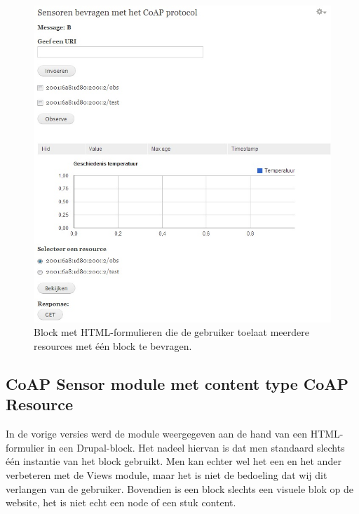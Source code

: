 \begin{figure}[h!]
\centering
\includegraphics[width=1\textwidth]{fig/meerdere_resources}
\caption{Block met HTML-formulieren die de gebruiker toelaat meerdere resources met \'{e}\'{e}n block te bevragen.}
\label{fig:meerdereResources}
\end{figure}

\subsection{CoAP Sensor module met content type CoAP Resource}
In de vorige versies werd de module weergegeven aan de hand van een HTML-formulier in een Drupal-block. Het nadeel hiervan is dat men standaard slechts \'{e}\'{e}n instantie van het block gebruikt. Men kan echter wel het een en het ander verbeteren met de Views module, maar het is niet de bedoeling dat wij dit verlangen van de gebruiker. Bovendien is een block slechts een visuele blok op de website, het is niet echt een node of een stuk content.\\

